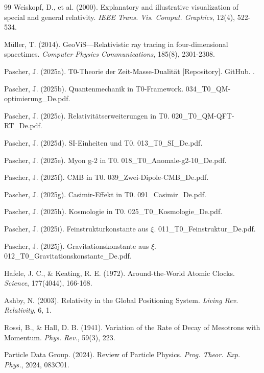 \begin{thebibliography}{99}
		Weiskopf, D., et al. (2000). Explanatory and illustrative visualization of special and general relativity. \emph{IEEE Trans. Vis. Comput. Graphics}, 12(4), 522-534.
		
		Müller, T. (2014). GeoViS—Relativistic ray tracing in four-dimensional spacetimes. \emph{Computer Physics Communications}, 185(8), 2301-2308.
		
		Pascher, J. (2025a). T0-Theorie der Zeit-Masse-Dualität [Repository]. GitHub. .
		
		Pascher, J. (2025b). Quantenmechanik in T0-Framework. 034\_T0\_QM-optimierung\_De.pdf.
		
		Pascher, J. (2025c). Relativitätserweiterungen in T0. 020\_T0\_QM-QFT-RT\_De.pdf.
		
		Pascher, J. (2025d). SI-Einheiten und T0. 013\_T0\_SI\_De.pdf.
		
		Pascher, J. (2025e). Myon g-2 in T0. 018\_T0\_Anomale-g2-10\_De.pdf.
		
		Pascher, J. (2025f). CMB in T0. 039\_Zwei-Dipole-CMB\_De.pdf.
		
		Pascher, J. (2025g). Casimir-Effekt in T0. 091\_Casimir\_De.pdf.
		
		Pascher, J. (2025h). Kosmologie in T0. 025\_T0\_Kosmologie\_De.pdf.
		
		Pascher, J. (2025i). Feinstrukturkonstante aus $\xi$. 011\_T0\_Feinstruktur\_De.pdf.
		
		Pascher, J. (2025j). Gravitationskonstante aus $\xi$. 012\_T0\_Gravitationskonstante\_De.pdf.
		
		Hafele, J. C., \& Keating, R. E. (1972). Around-the-World Atomic Clocks. \emph{Science}, 177(4044), 166-168.
		
		Ashby, N. (2003). Relativity in the Global Positioning System. \emph{Living Rev. Relativity}, 6, 1.
		
		Rossi, B., \& Hall, D. B. (1941). Variation of the Rate of Decay of Mesotrons with Momentum. \emph{Phys. Rev.}, 59(3), 223.
		
		Particle Data Group. (2024). Review of Particle Physics. \emph{Prog. Theor. Exp. Phys.}, 2024, 083C01.
		

\end{thebibliography}
